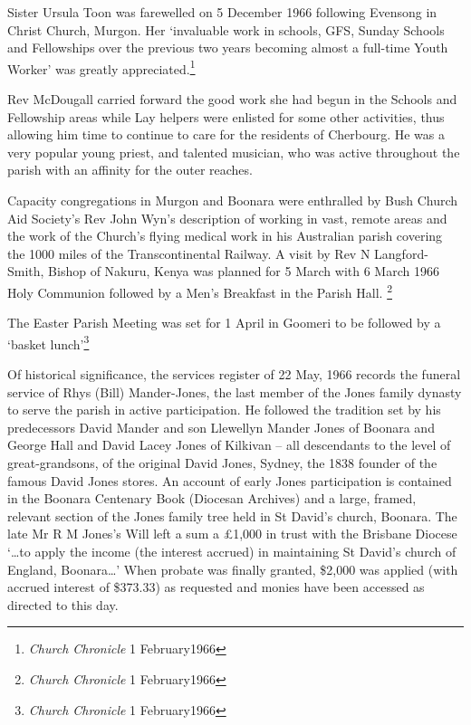 Sister Ursula Toon was farewelled on 5 December 1966 following Evensong in Christ Church, Murgon. Her `invaluable work in schools, GFS, Sunday Schools and Fellowships over the previous two years becoming almost a full-time Youth Worker' was greatly appreciated.\footnote{\emph{Church Chronicle} 1 February1966}


Rev McDougall carried forward the good work she had begun in the Schools and Fellowship areas while Lay helpers were enlisted for some other activities, thus allowing him time to continue to care for the residents of Cherbourg. He was a very popular young priest, and talented musician, who was active throughout the parish with an affinity for the outer reaches.



Capacity congregations in Murgon and Boonara were enthralled by Bush Church Aid Society's Rev John Wyn's description of working in vast, remote areas and the work of the Church's flying medical work in his Australian parish covering the 1000 miles of the Transcontinental Railway. A visit by Rev N Langford-Smith, Bishop of Nakuru, Kenya was planned for 5 March with 6 March 1966 Holy Communion followed by a Men's Breakfast in the Parish Hall. \footnote{\emph{Church Chronicle} 1 February1966}


The Easter Parish Meeting was set for 1 April in Goomeri to be followed by a `basket lunch'\footnote{\emph{Church Chronicle} 1 February1966}


Of historical significance, the services register of 22 May, 1966 records the funeral service of Rhys (Bill) Mander-Jones, the last member of the Jones family dynasty to serve the parish in active participation. He followed the tradition set by his predecessors David Mander and son Llewellyn Mander Jones of Boonara and George Hall and David Lacey Jones of Kilkivan -- all descendants to the level of great-grandsons, of the original David Jones, Sydney, the 1838 founder of the famous David Jones stores. An account of early Jones participation is contained in the Boonara Centenary Book (Diocesan Archives) and a large, framed, relevant section of the Jones family tree held in St David's church, Boonara. The late Mr R M Jones's Will left a sum a \pounds1,000 in trust with the Brisbane Diocese `\ldots to apply the income (the interest accrued) in maintaining St David's church of England, Boonara\ldots' When probate was finally granted, \$2,000 was applied (with accrued interest of \$373.33) as requested and monies have been accessed as directed to this day.









